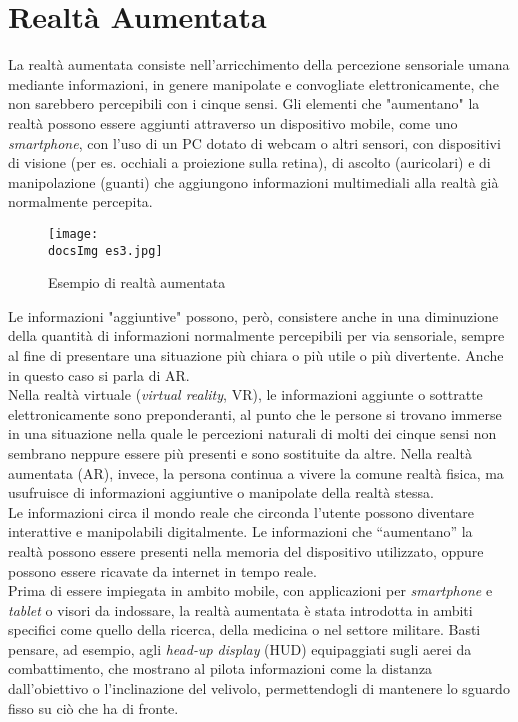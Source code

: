 \section{Realt\`a Aumentata}
La realtà aumentata consiste nell'arricchimento della percezione sensoriale umana mediante informazioni, in genere manipolate e convogliate elettronicamente, che non sarebbero percepibili con i cinque sensi.
Gli elementi che "aumentano" la realtà possono essere aggiunti attraverso un dispositivo mobile, come uno \textit{smartphone}, con l'uso di un PC dotato di webcam o altri sensori, con dispositivi di visione (per es. occhiali a proiezione sulla retina), di ascolto (auricolari) e di manipolazione (guanti) che aggiungono informazioni multimediali alla realtà già normalmente percepita.

\begin{figure}[H]
	\centering
	\texttt{[image: \\docsImg es3.jpg]}
	\caption{Esempio di realt\`a aumentata}
	\label{fig:Esempio di realta' aumentata presente nell'app Experenti - Motore}
\end{figure}
\noindent
Le informazioni "aggiuntive" possono, per\`o, consistere anche in una diminuzione della quantità di informazioni normalmente percepibili per via sensoriale, sempre al fine di presentare una situazione più chiara o più utile o più divertente. Anche in questo caso si parla di AR.\\
\noindent
Nella realtà virtuale (\textit{virtual reality}, VR), le informazioni aggiunte o sottratte elettronicamente sono preponderanti, al punto che le persone si trovano immerse in una situazione nella quale le percezioni naturali di molti dei cinque sensi non sembrano neppure essere più presenti e sono sostituite da altre. Nella realtà aumentata (AR), invece, la persona continua a vivere la comune realtà fisica, ma usufruisce di informazioni aggiuntive o manipolate della realtà stessa.\\
\noindent
Le informazioni circa il mondo reale che circonda l'utente possono diventare interattive e manipolabili digitalmente.
Le informazioni che “aumentano” la realtà possono essere presenti nella memoria del dispositivo utilizzato, oppure possono essere ricavate da internet in tempo reale.\\
\noindent
Prima di essere impiegata in ambito mobile, con applicazioni per \textit{smartphone} e \textit{tablet} o visori da indossare, la realtà aumentata è stata introdotta in ambiti specifici come quello della ricerca, della medicina o nel settore militare. Basti pensare, ad esempio, agli \textit{head-up display} (HUD) equipaggiati sugli aerei da combattimento, che mostrano al pilota informazioni come la distanza dall’obiettivo o l’inclinazione del velivolo, permettendogli di mantenere lo sguardo fisso su ciò che ha di fronte.
